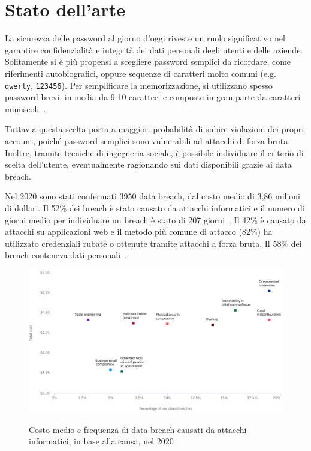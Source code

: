 \chapter{Stato dell'arte}
\label{ch:state of the art}

La sicurezza delle password al giorno d'oggi riveste un ruolo significativo nel garantire confidenzialità e integrità dei dati personali degli utenti e delle aziende.
Solitamente si è più propensi a scegliere password semplici da ricordare, come riferimenti autobiografici, oppure sequenze di caratteri molto comuni (e.g. \texttt{qwerty}, \texttt{123456}).
Per semplificare la memorizzazione, si utilizzano spesso password brevi, in media da 9-10 caratteri e composte in gran parte da caratteri minuscoli~\cite{obspasshab}.

Tuttavia questa scelta porta a maggiori probabilità di subire violazioni dei propri account, poiché password semplici sono vulnerabili ad attacchi di forza bruta. Inoltre, tramite tecniche di ingegneria sociale, è possibile individuare il criterio di scelta dell'utente, eventualmente ragionando sui dati disponibili grazie ai data breach.

Nel 2020 sono stati confermati 3950 data breach, dal costo medio di 3,86 milioni di dollari. Il 52\% dei breach è stato causato da attacchi informatici e il numero di giorni medio per individuare un breach è stato di 207 giorni~\cite{ibmcost}.
Il 42\% è causato da attacchi su applicazioni web e il metodo più comune di attacco (82\%) ha utilizzato credenziali rubate o ottenute tramite attacchi a forza bruta.
Il 58\% dei breach conteneva dati personali~\cite{verizon}.
\begin{figure}[h]
    \centering
    \includegraphics[width=15cm]{./immagini/prova.png}
    \label{data breach}
    \caption{Costo medio e frequenza di data breach causati da attacchi informatici, in base alla causa, nel 2020~\cite{ibmcost}}
\end{figure}

